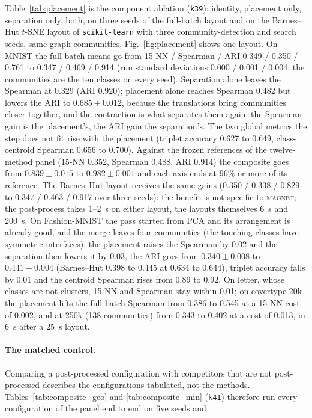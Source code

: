 \documentclass[11pt]{article}
\newcommand{\magnet}{\textsc{magnet}}
\begin{document}
Table~\ref{tab:placement} is the component ablation (\texttt{k39}): identity, placement only, separation
only, both, on three seeds of the full-batch layout and on the Barnes--Hut $t$-SNE layout of
\texttt{scikit-learn} with three community-detection and search seeds, same graph communities, Fig.~\ref{fig:placement}
shows one layout. On MNIST the full-batch means go from 15-NN / Spearman / ARI 0.349 / 0.350 / 0.761 to
0.347 / 0.469 / 0.914 (run standard deviations 0.000 / 0.001 / 0.004; the communities are the ten classes on
every seed). Separation alone leaves the Spearman at 0.329 (ARI 0.920); placement alone reaches Spearman
0.482 but lowers the ARI to $0.685 \pm 0.012$, because the translations bring communities closer together,
and the contraction is what separates them again: the Spearman gain is the placement's, the ARI gain the
separation's. The two global metrics the step does not fit rise with the placement (triplet accuracy 0.627
to 0.649, class-centroid Spearman 0.656 to 0.700). Against the frozen references of the twelve-method panel
(15-NN 0.352, Spearman 0.488, ARI 0.914) the composite goes from $0.839 \pm 0.015$ to $0.982 \pm 0.001$ and
each axis ends at 96\% or more of its reference. The Barnes--Hut layout receives the same gains (0.350 /
0.338 / 0.829 to 0.347 / 0.463 / 0.917 over three seeds): the benefit is not specific to \magnet{}; the
post-process takes 1--2~s on either layout, the layouts themselves 6~s and 200~s. On Fashion-MNIST the pass
started from PCA and its arrangement is already good, and the merge leaves four communities (the touching
classes have symmetric interfaces): the placement raises the Spearman by 0.02 and the separation then
lowers it by 0.03, the ARI goes from $0.340 \pm 0.008$ to $0.441 \pm 0.004$ (Barnes--Hut 0.398 to 0.445 at
0.634 to 0.644), triplet accuracy falls by 0.01 and the centroid Spearman rises from 0.89 to 0.92. On letter,
whose classes are not clusters, 15-NN and Spearman stay within 0.01; on covertype 20k the placement lifts the
full-batch Spearman from 0.386 to 0.545 at a 15-NN cost of 0.002, and at 250k (138 communities) from 0.343 to
0.402 at a cost of 0.013, in 6~s after a 25~s layout. \paragraph{The matched control.} Comparing a post-processed configuration with competitors that are not
post-processed describes the configurations tabulated, not the methods. Tables~\ref{tab:composite_geo} and
\ref{tab:composite_min} (\texttt{k41}) therefore run every configuration of the panel end to end on five seeds and
\end{document}
